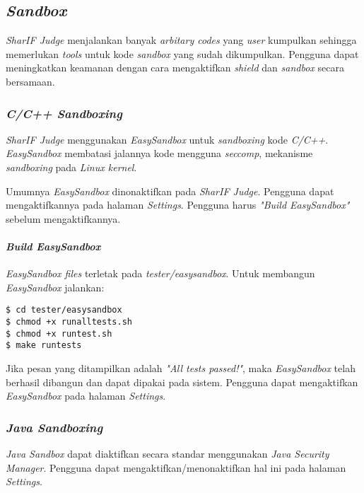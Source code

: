 \subsection{\textit{Sandbox}}
\label{subsec:sandbox}
\textit{SharIF Judge} menjalankan banyak \textit{arbitary codes} yang \textit{user} kumpulkan sehingga memerlukan \textit{tools} untuk kode \textit{sandbox} yang sudah dikumpulkan. Pengguna dapat meningkatkan keamanan dengan cara mengaktifkan \textit{shield} dan \textit{sandbox} secara bersamaan.

\subsubsection{\textit{C/C++ Sandboxing}}
\label{subsubsec:sandbox_c/c++}
\textit{SharIF Judge} menggunakan \textit{EasySandbox} untuk \textit{sandboxing} kode \textit{C/C++}. \textit{EasySandbox} membatasi jalannya kode mengguna \textit{seccomp}, mekanisme \textit{sandboxing} pada \textit{Linux kernel}.

Umumnya \textit{EasySandbox} dinonaktifkan pada \textit{SharIF Judge}. Pengguna dapat mengaktifkannya pada halaman \textit{Settings}. Pengguna harus \textit{"Build EasySandbox"} sebelum mengaktifkannya.

\paragraph{\textit{Build EasySandbox}}

\textit{EasySandbox files} terletak pada \textit{tester/easysandbox}. Untuk membangun \textit{EasySandbox} jalankan:

\begin{lstlisting}[basicstyle=\ttfamily, frame=single,
columns=fullflexible, keepspaces=true, breaklines=true, label=ls:18]
$ cd tester/easysandbox
$ chmod +x runalltests.sh
$ chmod +x runtest.sh
$ make runtests
\end{lstlisting}

Jika pesan yang ditampilkan adalah \textit{"All tests passed!"}, maka \textit{EasySandbox} telah berhasil dibangun dan dapat dipakai pada sistem. Pengguna dapat mengaktifkan \textit{EasySandbox} pada halaman \textit{Settings}.

\subsubsection{\textit{Java Sandboxing}}
\label{subsubsec:java_sandbox}
\textit{Java Sandbox} dapat diaktifkan secara standar menggunakan \textit{Java Security Manager}. Pengguna dapat mengaktifkan/menonaktifkan hal ini pada halaman \textit{Settings}.

